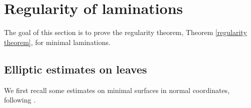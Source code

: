 \documentclass[reqno,11pt]{amsart}
\theoremstyle{definition}
\numberwithin{equation}{section}
\begin{document}


\section{Regularity of laminations}\label{Regularity}
The goal of this section is to prove the regularity theorem, Theorem \ref{regularity theorem}, for minimal laminations.

\subsection{Elliptic estimates on leaves}\label{Leaf estimates}
We first recall some estimates on minimal surfaces in normal coordinates, following \cite[\S7.1]{colding2011course}.
\end{document}
